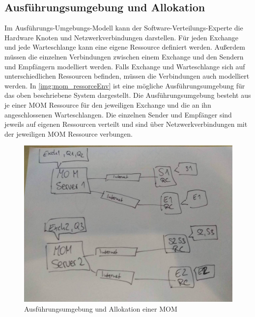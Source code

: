 \subsection{Ausführungsumgebung und Allokation}
Im Ausführungs-Umgebungs-Modell kann der Software-Verteilungs-Experte die Hardware Knoten und Netzwerkverbindungen darstellen. Für jeden Exchange und jede Warteschlange kann eine eigene Ressource definiert werden. Außerdem müssen die einzelnen Verbindungen zwischen einem Exchange und den Sendern und Empfängern modelliert werden. Falls Exchange und Warteschlange sich auf unterschiedlichen Ressourcen befinden, müssen die Verbindungen auch modelliert werden. In \autoref{img:mom_ressorceEnv} ist eine mögliche Ausführungsumgebung für das oben beschriebene System dargestellt. Die Ausführungsumgebung besteht aus je einer MOM Ressource für den jeweiligen Exchange und die an ihn angeschlossenen Warteschlangen. Die einzelnen Sender und Empfänger sind jeweils auf eigenen Ressourcen verteilt und sind über Netzwerkverbindungen mit der jeweiligen MOM Ressource verbungen. 
\begin{figure}
\center
  \includegraphics[width=1\textwidth]{images/modelling/recenv.png}
  \caption{Ausführungsumgebung und Allokation einer MOM}
  \label{img:mom_ressorceEnv}
\end{figure}


